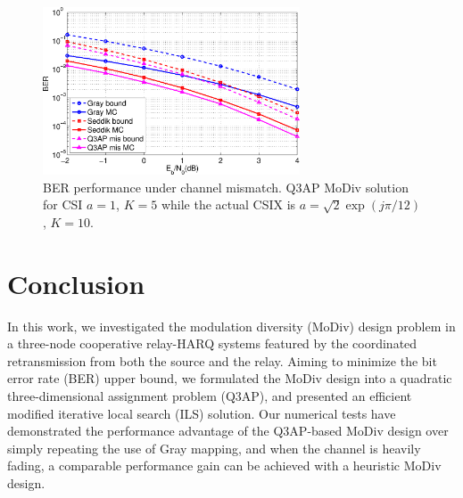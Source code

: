 \documentclass[journal]{IEEEtran}
\begin{document}
\begin{figure}[!t]
    \centering
    \includegraphics[width=3.0in]{./figs/mismatch.eps}
    \caption{BER performance under channel mismatch. Q3AP MoDiv solution for
    CSI
    $a=1$, $K=5$ while the actual CSIX is $a = \sqrt{2}\exp(j\pi/12)$, $K
    = 10$.}
    \label{fig:mismatch}
\end{figure}

\section{Conclusion}
\label{sec:conclusion}
In this work, we investigated the modulation diversity (MoDiv) design problem in
a three-node cooperative relay-HARQ systems featured by the coordinated
retransmission from both the source and the relay. Aiming to minimize the bit
error rate (BER) upper bound, we formulated the MoDiv design into a quadratic
three-dimensional assignment problem (Q3AP), and presented an efficient modified
iterative local search (ILS) solution. Our numerical tests have demonstrated the
performance advantage of the Q3AP-based MoDiv design over simply repeating the
use of Gray mapping, and when the channel is heavily fading, a comparable
performance gain can be achieved with a heuristic MoDiv design. 









\end{document}
